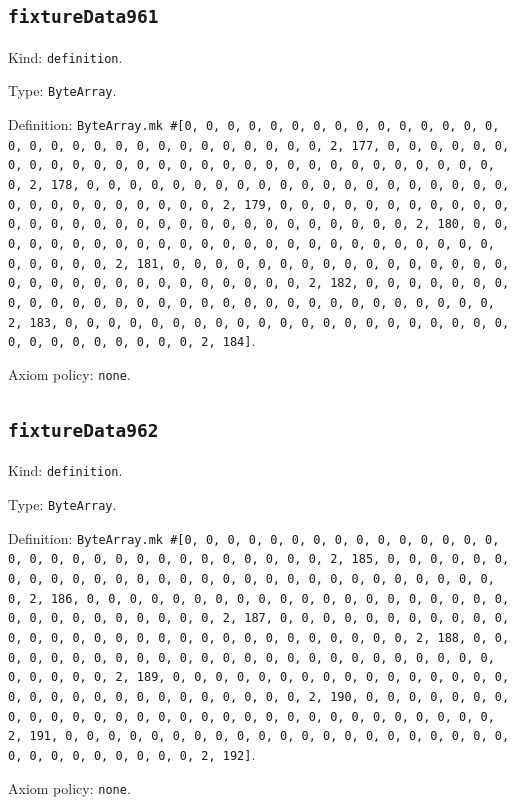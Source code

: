 \documentclass[11pt]{article}
\begin{document}
\subsection*{\texttt{fixtureData961}}
\noindent Kind: \texttt{definition}.\par
\noindent Type: \texttt{ByteArray}.\par
\noindent Definition: \texttt{ByteArray.mk \#[0, 0, 0, 0, 0, 0, 0, 0, 0, 0, 0, 0, 0, 0, 0, 0, 0, 0, 0, 0, 0, 0, 0, 0, 0, 0, 0, 0, 0, 0, 2, 177, 0, 0, 0, 0, 0, 0, 0, 0, 0, 0, 0, 0, 0, 0, 0, 0, 0, 0, 0, 0, 0, 0, 0, 0, 0, 0, 0, 0, 0, 0, 2, 178, 0, 0, 0, 0, 0, 0, 0, 0, 0, 0, 0, 0, 0, 0, 0, 0, 0, 0, 0, 0, 0, 0, 0, 0, 0, 0, 0, 0, 0, 0, 2, 179, 0, 0, 0, 0, 0, 0, 0, 0, 0, 0, 0, 0, 0, 0, 0, 0, 0, 0, 0, 0, 0, 0, 0, 0, 0, 0, 0, 0, 0, 0, 2, 180, 0, 0, 0, 0, 0, 0, 0, 0, 0, 0, 0, 0, 0, 0, 0, 0, 0, 0, 0, 0, 0, 0, 0, 0, 0, 0, 0, 0, 0, 0, 2, 181, 0, 0, 0, 0, 0, 0, 0, 0, 0, 0, 0, 0, 0, 0, 0, 0, 0, 0, 0, 0, 0, 0, 0, 0, 0, 0, 0, 0, 0, 0, 2, 182, 0, 0, 0, 0, 0, 0, 0, 0, 0, 0, 0, 0, 0, 0, 0, 0, 0, 0, 0, 0, 0, 0, 0, 0, 0, 0, 0, 0, 0, 0, 2, 183, 0, 0, 0, 0, 0, 0, 0, 0, 0, 0, 0, 0, 0, 0, 0, 0, 0, 0, 0, 0, 0, 0, 0, 0, 0, 0, 0, 0, 0, 0, 2, 184]}.\par
\noindent Axiom policy: \texttt{none}.\par
\subsection*{\texttt{fixtureData962}}
\noindent Kind: \texttt{definition}.\par
\noindent Type: \texttt{ByteArray}.\par
\noindent Definition: \texttt{ByteArray.mk \#[0, 0, 0, 0, 0, 0, 0, 0, 0, 0, 0, 0, 0, 0, 0, 0, 0, 0, 0, 0, 0, 0, 0, 0, 0, 0, 0, 0, 0, 0, 2, 185, 0, 0, 0, 0, 0, 0, 0, 0, 0, 0, 0, 0, 0, 0, 0, 0, 0, 0, 0, 0, 0, 0, 0, 0, 0, 0, 0, 0, 0, 0, 2, 186, 0, 0, 0, 0, 0, 0, 0, 0, 0, 0, 0, 0, 0, 0, 0, 0, 0, 0, 0, 0, 0, 0, 0, 0, 0, 0, 0, 0, 0, 0, 2, 187, 0, 0, 0, 0, 0, 0, 0, 0, 0, 0, 0, 0, 0, 0, 0, 0, 0, 0, 0, 0, 0, 0, 0, 0, 0, 0, 0, 0, 0, 0, 2, 188, 0, 0, 0, 0, 0, 0, 0, 0, 0, 0, 0, 0, 0, 0, 0, 0, 0, 0, 0, 0, 0, 0, 0, 0, 0, 0, 0, 0, 0, 0, 2, 189, 0, 0, 0, 0, 0, 0, 0, 0, 0, 0, 0, 0, 0, 0, 0, 0, 0, 0, 0, 0, 0, 0, 0, 0, 0, 0, 0, 0, 0, 0, 2, 190, 0, 0, 0, 0, 0, 0, 0, 0, 0, 0, 0, 0, 0, 0, 0, 0, 0, 0, 0, 0, 0, 0, 0, 0, 0, 0, 0, 0, 0, 0, 2, 191, 0, 0, 0, 0, 0, 0, 0, 0, 0, 0, 0, 0, 0, 0, 0, 0, 0, 0, 0, 0, 0, 0, 0, 0, 0, 0, 0, 0, 0, 0, 2, 192]}.\par
\noindent Axiom policy: \texttt{none}.\par
\end{document}
